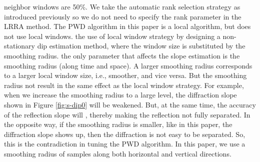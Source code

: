 neighbor windows are 50\%. We take the automatic rank selection strategy as introduced previously so we do not need to specify the rank parameter in the LRRA method. The PWD algorithm \cite{fomel2002pwd} in this paper is a local algorithm, but does not use local windows. \cite{fomel2002pwd}  the use of local window strategy by designing a non-stationary dip estimation method, where the window size is substituted by the smoothing radius.  the only parameter that affects the slope estimation is the smoothing radius (along time and space). A larger smoothing radius corresponds to a larger local window size, i.e., smoother, and vice versa. But the smoothing radius  not result in the same effect as the local window strategy. For example, when we increase the smoothing radius to a large level, the diffraction slope shown in Figure \ref{fig:s-dip0} will be weakened. But, at the same time, the accuracy of the reflection slope will , thereby making the reflection not fully separated. In the opposite way, if the smoothing radius is smaller, like in this paper, the diffraction slope shows up, then the diffraction is not easy to be separated. So, this is the contradiction in tuning the PWD algorithm. In this paper, we use a smoothing radius of  samples along both horizontal and vertical directions.


